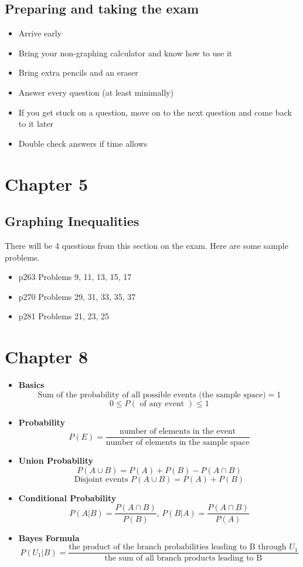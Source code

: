 \documentclass[12pt]{article}
\begin{document}
\subsection*{Preparing and taking the exam}
\begin{itemize}
\item Arrive early
\item Bring your non-graphing calculator and know how to use it
\item Bring extra pencils and an eraser
\item Answer every question (at least minimally)
\item If you get stuck on a question, move on to the next question and come back to it later
\item Double check answers if time allows

\end{itemize}

\section*{Chapter 5}

\subsection*{Graphing Inequalities}
There will be 4 questions from this section on the exam. Here are some sample problems.
\begin{itemize}
\item p263 Problems 9, 11, 13, 15, 17
\item p270 Problems 29, 31, 33, 35, 37
\item p281 Problems 21, 23, 25
\end{itemize}

\section*{Chapter 8}

\begin{itemize}
\item \textbf{Basics}
$$\text{Sum of the probability of all possible events (the sample space)}  = 1$$
$$0\leq P(\text{ of any event }) \leq 1$$
\item \textbf{Probability}
$$P(E) = \frac{\text{number of elements in the event}}{\text{number of elements in the sample space}}$$
\item \textbf{Union Probability}
$$P(A \cup B) = P(A) + P(B) - P(A \cap B)$$
$$\text{Disjoint events }P(A \cup B) = P(A) + P(B)$$
\item \textbf{Conditional Probability}
$$P(A \vert B)=\frac{P(A \cap B)}{P(B)}\text{, }P(B \vert A)=\frac{P(A \cap B)}{P(A)}$$
\item \textbf{Bayes Formula}
\[P(U_1|B) =
 \frac{\text{
 the product of the branch probabilities leading to B through $U_1$}}
 {\text{
 the sum of all branch products leading to B}}
\]
\end{itemize}
\end{document}

